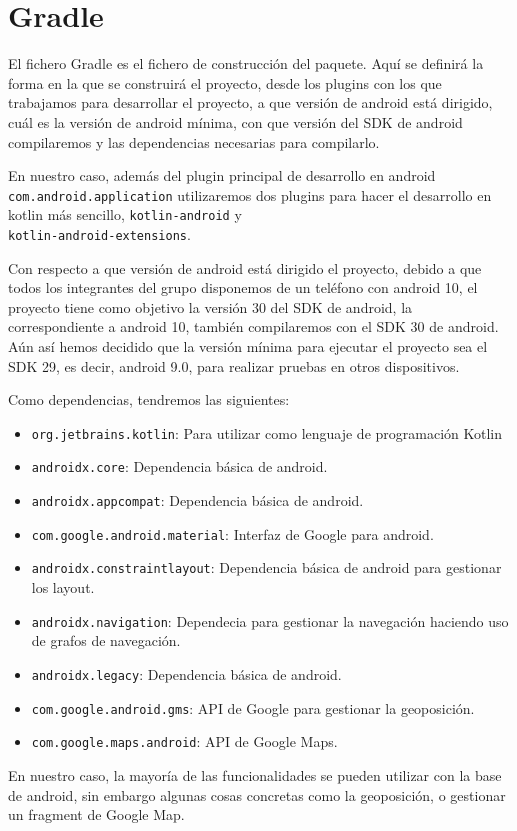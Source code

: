 \section{Gradle}

El fichero Gradle es el fichero de construcción del paquete. Aquí se definirá la forma en la que se construirá el proyecto, desde los plugins con los que trabajamos para desarrollar el proyecto, a que versión de android está dirigido, cuál es la versión de android mínima, con que versión del SDK de android compilaremos y las dependencias necesarias para compilarlo.


En nuestro caso, además del plugin principal de desarrollo en android \texttt{com.android.application} utilizaremos dos plugins para hacer el desarrollo en kotlin más sencillo, \texttt{kotlin-android} y \\ \texttt{kotlin-android-extensions}.

Con respecto a que versión de android está dirigido el proyecto, debido a que todos los integrantes del grupo disponemos de un teléfono con android 10, el proyecto tiene como objetivo la versión 30 del SDK de android, la correspondiente a android 10, también compilaremos con el SDK 30 de android. Aún así hemos decidido que la versión mínima para ejecutar el proyecto sea el SDK 29, es decir, android 9.0, para realizar pruebas en otros dispositivos.



Como dependencias, tendremos las siguientes:

\begin{itemize}
	\item \texttt{org.jetbrains.kotlin}: Para utilizar como lenguaje de programación Kotlin
	\item \texttt{androidx.core}: Dependencia básica de android.
	\item \texttt{androidx.appcompat}: Dependencia básica de android.
	\item \texttt{com.google.android.material}: Interfaz de Google para android.
	\item \texttt{androidx.constraintlayout}: Dependencia básica de android para gestionar los layout.
	\item \texttt{androidx.navigation}: Dependecia para gestionar la navegación haciendo uso de grafos de navegación.
	\item \texttt{androidx.legacy}: Dependencia básica de android.
	\item \texttt{com.google.android.gms}: API de Google para gestionar la geoposición.
	\item \texttt{com.google.maps.android}: API de Google Maps.
\end{itemize}


En nuestro caso, la mayoría de las funcionalidades se pueden utilizar con la base de android, sin embargo algunas cosas concretas como la geoposición, o gestionar un fragment de Google Map.


